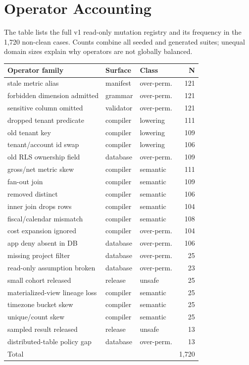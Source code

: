 \section{Operator Accounting}
\label{app:operator-accounting}

The table lists the full v1 read-only mutation registry and its frequency in the 1,720 non-clean cases. Counts combine all seeded and generated suites; unequal domain sizes explain why operators are not globally balanced.

\begin{center}
\scriptsize
\setlength{\tabcolsep}{2pt}
\begin{tabular}{@{}L{0.49\columnwidth}llr@{}}
\toprule
Operator family & Surface & Class & N \\
\midrule
stale metric alias & manifest & over-perm. & 121 \\
forbidden dimension admitted & grammar & over-perm. & 121 \\
sensitive column omitted & validator & over-perm. & 121 \\
dropped tenant predicate & compiler & lowering & 111 \\
old tenant key & compiler & lowering & 109 \\
tenant/account id swap & compiler & lowering & 106 \\
old RLS ownership field & database & over-perm. & 109 \\
gross/net metric skew & compiler & semantic & 111 \\
fan-out join & compiler & semantic & 109 \\
removed distinct & compiler & semantic & 106 \\
inner join drops rows & compiler & semantic & 104 \\
fiscal/calendar mismatch & compiler & semantic & 108 \\
cost expansion ignored & compiler & over-perm. & 104 \\
app deny absent in DB & database & over-perm. & 106 \\
missing project filter & database & over-perm. & 25 \\
read-only assumption broken & database & over-perm. & 23 \\
small cohort released & release & unsafe & 25 \\
materialized-view lineage loss & compiler & semantic & 25 \\
timezone bucket skew & compiler & semantic & 25 \\
unique/count skew & compiler & semantic & 25 \\
sampled result released & release & unsafe & 13 \\
distributed-table policy gap & database & over-perm. & 13 \\
\midrule
Total & & & 1,720 \\
\bottomrule
\end{tabular}
\end{center}
